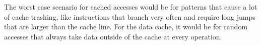 \documentclass{article}
\begin{document}
\begin{enumerate}
        The worst case scenario for cached accesses would be for patterns that cause a lot of cache trashing, like instructions that branch very often and require long jumps that are larger than the cache line. For the data cache, it would be for random accesses that always take data outside of the cache at every operation.

\end{enumerate}
\end{document}
